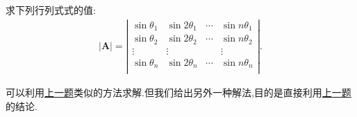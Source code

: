 \documentclass[../../main.tex]{subfiles}%
\begin{document}
\begin{example}
求下列行列式式的值:
\begin{align*}
|\boldsymbol{A}|=\left| \begin{matrix}
\sin \theta _1&		\sin 2\theta _1&		\cdots&		\sin n\theta _1\\
\sin \theta _2&		\sin 2\theta _2&		\cdots&		\sin n\theta _2\\
\vdots&		\vdots&		&		\vdots\\
\sin \theta _n&		\sin 2\theta _n&		\cdots&		\sin n\theta _n\\
\end{matrix} \right|.
\end{align*}
\end{example}
\begin{note}
可以利用\hyperref[Vandermode行列式三角函数例题]{上一题}类似的方法求解.但我们给出另外一种解法,目的是直接利用\hyperref[Vandermode行列式三角函数例题]{上一题}的结论.
\end{note}
\end{document}
